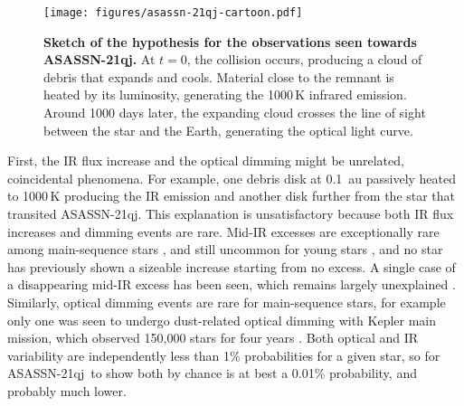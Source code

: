 \documentclass[sn-nature,oneside]{sn-jnl}%
\newcommand{\asas}{ASASSN-21qj}
\begin{document}
\begin{figure}
    \centering
\texttt{[image: figures/asassn-21qj-cartoon.pdf]}
    \caption{\textbf{Sketch of the hypothesis for the observations seen towards ASASSN-21qj.}
    At $t=0$, the collision occurs, producing a cloud of debris that expands and cools.
    Material close to the remnant is heated by its luminosity, generating the 1000\,K infrared emission.
    Around 1000 days later, the expanding cloud crosses the line of sight between the star and the Earth, generating the optical light curve.}
    \label{fig:hypothesis}
\end{figure}



First, the IR flux increase and the optical dimming might be unrelated, coincidental phenomena. 
%
For example, one debris disk at 0.1~au passively heated to 1000\,K producing the IR emission and another disk further from the star that transited \asas.
%
This explanation is unsatisfactory because both IR flux increases and dimming events are rare.
%
Mid-IR excesses are exceptionally rare among main-sequence stars \cite[1:10,000,][]{2013MNRAS.433.2334K}, and still uncommon for young stars \cite[1:100,][]{2013MNRAS.433.2334K}, and no star has previously shown a sizeable increase starting from no excess.
%
A single case of a disappearing mid-IR excess has been seen, which remains largely unexplained \cite{2012Natur.487...74M}.
%
Similarly, optical dimming events are rare for main-sequence stars, for example only one was seen to undergo dust-related optical dimming with Kepler main mission, which observed 150,000 stars for four years \cite{2016MNRAS.457.3988B}.
%
Both optical and IR variability are independently less than 1\% probabilities for a given star, so for \asas~to show both by chance is at best a 0.01\% probability, and probably much lower.
\end{document}
